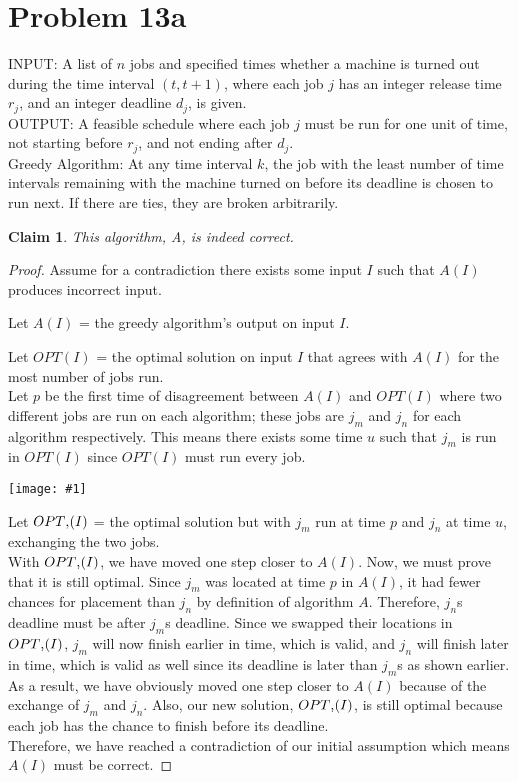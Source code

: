 \documentclass{article}
\newtheorem{thm}{Claim}
\providecommand{\prob}[1]{\section*{Problem #1}}
\providecommand{\image}[1]{
    \begin{center}
        \texttt{[image: \#1]}
    \end{center}
}
\begin{document}
	\prob{13a}
	INPUT: A list of $n$ jobs and specified times whether a machine is turned out during the time interval $(t, t + 1)$, where each job $j$ has an integer release time $r_j$, and an integer deadline $d_j$, is given. \\
	OUTPUT: A feasible schedule where each job $j$ must be run for one unit of time, not starting before $r_j$, and not ending after $d_j$. \\
	
	Greedy Algorithm: At any time interval $k$, the job with the least number of time intervals remaining with the machine turned on before its deadline is chosen to run next.  If there are ties, they are broken arbitrarily.
	
	\begin{thm}
		This algorithm, A, is indeed correct.
	\end{thm}
	
	\begin{proof}
		Assume for a contradiction there exists some input $I$ such that $A(I)$ produces incorrect input.
		
		Let $A(I)$ = the greedy algorithm's output on input $I$.
		
		Let $OPT(I)$ = the optimal solution on input $I$ that agrees
		with $A(I)$ for the most number of jobs run.\\
		
		Let $p$ be the first time of disagreement between $A(I)$ and $OPT(I)$ where two different jobs are run on each algorithm; these jobs are $j_m$ and $j_n$ for each algorithm respectively.  This means there exists some time $u$ such that $j_m$ is run in $OPT(I)$ since $OPT(I)$ must run every job.
		
		\image{p13atable}
		
		Let $OPT\textsc{\char13}(I)$ = the optimal solution but with $j_m$ run at time $p$ and $j_n$ at time $u$, exchanging the two jobs.\\
		
		With $OPT\textsc{\char13}(I)$, we have moved one step closer to $A(I)$.  Now, we must prove that it is still optimal.  Since $j_m$ was located at time $p$ in $A(I)$, it had fewer chances for placement than $j_n$ by definition of algorithm $A$.  Therefore, $j_n$\textsc{}s deadline must be after $j_m$\textsc{}s deadline.  Since we swapped their locations in $OPT\textsc{\char13}(I)$, $j_m$ will now finish earlier in time, which is valid, and $j_n$ will finish later in time, which is valid as well since its deadline is later than $j_m$\textsc{}s as shown earlier.\\
		
		As a result, we have obviously moved one step closer to $A(I)$ because of the exchange of $j_m$ and $j_n$.  Also, our new solution, $OPT\textsc{\char13}(I)$, is still optimal because each job has the chance to finish before its deadline.\\
		
		Therefore, we have reached a contradiction of our initial assumption which means $A(I)$ must be correct. 
	\end{proof}
\end{document}
